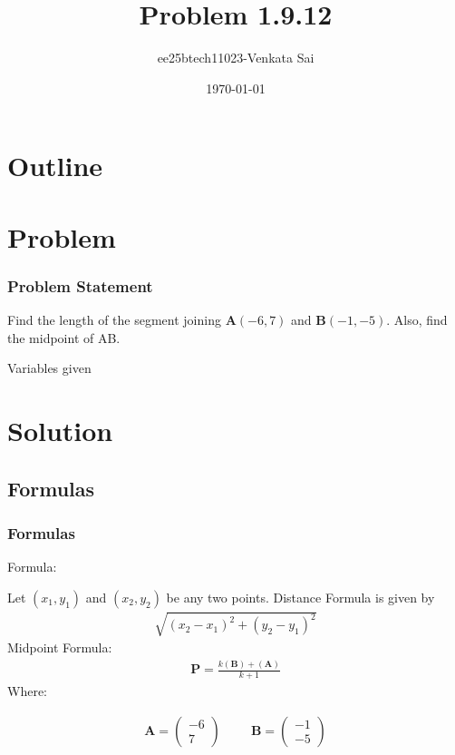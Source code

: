 \documentclass{beamer}
\title{Problem 1.9.12}
\author{ee25btech11023-Venkata Sai}
\date{\today}
\providecommand{\brak}[1]{\ensuremath{\left(#1\right)}}
\theoremstyle{remark}
\newcommand{\myvec}[1]{\ensuremath{\begin{pmatrix}#1\end{pmatrix}}}
\let\vec\mathbf
\numberwithin{equation}{section}
\begin{document}
\begin{frame}
\titlepage
\end{frame}

\section*{Outline}
\begin{frame}
\tableofcontents
\end{frame}
\section{Problem}
\begin{frame}
\frametitle{Problem Statement}
%
Find the length of the segment joining \textbf{A}$\brak{-6,7}$ and \textbf{B}$\brak{-1,-5}$. Also, find the
midpoint of AB. 
 \begin{table}[h!]    
  \centering
  
  \caption{Variables given}
  \label{tab 1.4.9.2}
\end{table}
\end{frame}

\section{Solution}
\subsection{Formulas}
\begin{frame}
\frametitle{Formulas}
Formula:

Let $(x_1,y_1)$ and $(x_2,y_2)$ be any two points.
Distance Formula is given by
\begin{align}
  \sqrt{\brak{x_2 - x_1}^2 + \brak{y_2 - y_1}^2}
\end{align}
Midpoint Formula:
\begin{align}
   \vec{P}=\frac{k(\vec{B})+(\vec{A})}{k+1}
\end{align}
Where: 


\begin{align}
\vec{A}=\myvec{-6\\7} \hspace{1cm} \vec{B}=\myvec{-1\\-5} 
\end{align}


\end{frame}
\end{document}
